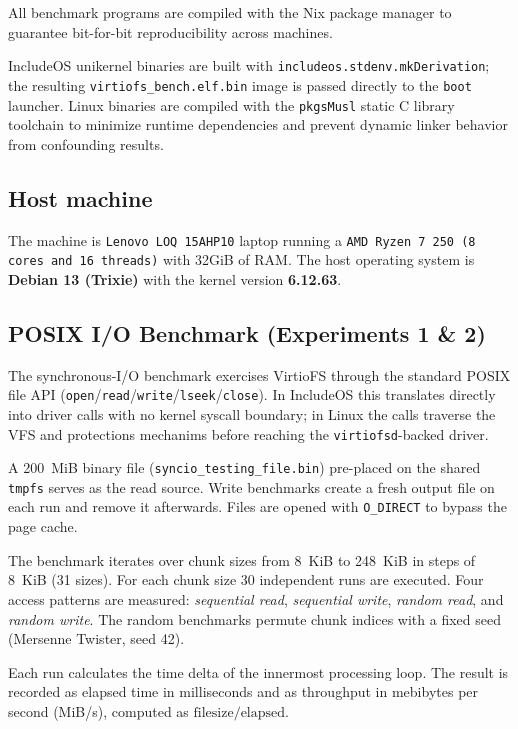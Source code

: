 \documentclass[12pt, a4paper, oneside]{report}
\begin{document}
All benchmark programs are compiled with the Nix package manager to guarantee
bit-for-bit reproducibility across machines.

IncludeOS unikernel binaries are built with
\texttt{includeos.stdenv.mkDerivation}; the resulting
\texttt{virtiofs\_bench.elf.bin} image is passed directly to the
\texttt{boot} launcher.  Linux binaries are compiled with the \texttt{pkgsMusl}
static C library toolchain to minimize runtime dependencies and prevent dynamic
linker behavior from confounding results.

\subsection{Host machine}

The machine is \texttt{Lenovo LOQ 15AHP10} laptop running a \texttt{AMD Ryzen 7 250 (8 cores and 16 threads)} with 32GiB of RAM. The host operating system is \textbf{Debian 13 (Trixie)} with the kernel version \textbf{6.12.63}.

\subsection{POSIX I/O Benchmark (Experiments 1 \& 2)}
\label{sec:posix_setup}

The synchronous-I/O benchmark exercises VirtioFS through the standard POSIX file
API (\texttt{open}/\texttt{read}/\texttt{write}/\texttt{lseek}/\texttt{close}).
In IncludeOS this translates directly into driver calls with no kernel syscall
boundary; in Linux the calls traverse the VFS and protections mechanims before reaching
the \texttt{virtiofsd}-backed driver.

A 200~MiB binary file (\texttt{syncio\_testing\_file.bin}) pre-placed on the shared \texttt{tmpfs}
serves as the read source. Write benchmarks create a fresh output file on each
run and remove it afterwards. Files are opened with \texttt{O\_DIRECT} to bypass the page cache.

The benchmark iterates over chunk sizes from 8~KiB to
248~KiB in steps of 8~KiB (31 sizes).  For each chunk size 30 independent runs
are executed.  Four access patterns are measured: \emph{sequential read},
\emph{sequential write}, \emph{random read}, and \emph{random write}.  The
random benchmarks permute chunk indices with a fixed seed (Mersenne Twister,
seed 42).

Each run calculates the time delta of the innermost processing
loop. The result is recorded as elapsed time in milliseconds and as throughput
in mebibytes per second (MiB/s), computed as $\text{filesize} / \text{elapsed}$.
\end{document}
